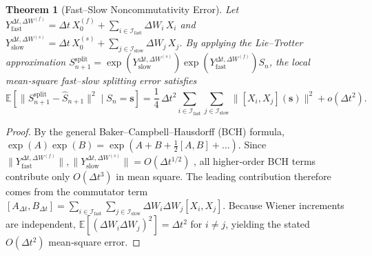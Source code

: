 \documentclass{article}
\newtheorem{theorem}{Theorem}
\begin{document}
\begin{theorem}[Fast--Slow Noncommutativity Error]
\label{lem:splitting}
Let $
Y_{\mathrm{fast}}^{\Delta t,\Delta W^{(f)}}
=
\Delta t\,X_0^{(f)}
+
\sum_{i\in\mathcal{I}_{\mathrm{fast}}}
\Delta W_i\,X_i$ and $
Y_{\mathrm{slow}}^{\Delta t,\Delta W^{(s)}}
=
\Delta t\,X_0^{(s)}
+
\sum_{j\in\mathcal{I}_{\mathrm{slow}}}
\Delta W_j\,X_j$.
By applying the Lie--Trotter approximation
$S^{\mathrm{split}}_{n+1}=\exp(Y_{\mathrm{slow}}^{\Delta t,\Delta W^{(s)}})\exp(Y_{\mathrm{fast}}^{\Delta t,\Delta W^{(f)}})S_n$,
the local mean‑square fast–slow splitting error satisfies
\begin{equation}
\label{eq:splitting_error}
\mathbb{E}\!\left[
\|S_{n+1}^{\mathrm{split}}-\widehat{S}_{n+1}\|^2
\mid S_n=\pmb{s}
\right]
=
\frac14\,\Delta t^2
\sum_{i\in\mathcal{I}_{\mathrm{fast}}}
\sum_{j\in\mathcal{I}_{\mathrm{slow}}}
\|[X_i,X_j](\pmb{s})\|^2
+
o(\Delta t^2).
\end{equation}
\end{theorem}

\begin{proof}
By the general Baker–Campbell–Hausdorff (BCH) formula,
$\exp(A)\exp(B)=\exp(A+B+\tfrac12[A,B]+\ldots)$.
Since $\|Y_{\mathrm{fast}}^{\Delta t,\Delta W^{(f)}}\|,\|Y_{\mathrm{slow}}^{\Delta t,\Delta W^{(s)}}\|=O(\Delta t^{1/2})$ ,
all higher‑order BCH terms contribute only $O(\Delta t^3)$ in mean square.
The leading contribution therefore comes from the commutator term
$[A_{\Delta t},B_{\Delta t}]
=\sum_{i\in\mathcal I_{\mathrm{fast}}}\sum_{j\in\mathcal I_{\mathrm{slow}}}
\Delta W_i\Delta W_j[X_i,X_j]$.
Because Wiener increments are independent,
$\mathbb E[(\Delta W_i\Delta W_j)^2]=\Delta t^2$ for $i\neq j$,
yielding the stated $O(\Delta t^2)$ mean‑square error.
\end{proof}


\end{document}
